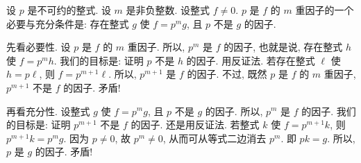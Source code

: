 \begin{proposition}
    设 $p$ 是不可约的整式. 设 $m$ 是非负整数. 设整式 $f \neq 0$. $p$ 是 $f$ 的 $m$ 重因子的一个必要与充分条件是: 存在整式 $g$ 使 $f = p^m g$, 且 $p$ 不是 $g$ 的因子.
\end{proposition}

\begin{pf}
    先看必要性. 设 $p$ 是 $f$ 的 $m$ 重因子. 所以, $p^m$ 是 $f$ 的因子, 也就是说, 存在整式 $h$ 使 $f = p^m h$. 我们的目标是: 证明 $p$ 不是 $h$ 的因子. 用反证法. 若存在整式 $\ell$ 使 $h = p\ell$, 则 $f = p^{m+1} \ell$. 所以, $p^{m+1}$ 是 $f$ 的因子. 不过, 既然 $p$ 是 $f$ 的 $m$ 重因子, $p^{m+1}$ 不是 $f$ 的因子. 矛盾!

    再看充分性. 设整式 $g$ 使 $f = p^m g$, 且 $p$ 不是 $g$ 的因子. 所以, $p^m$ 是 $f$ 的因子. 我们的目标是: 证明 $p^{m+1}$ 不是 $f$ 的因子. 还是用反证法. 若整式 $k$ 使 $f = p^{m+1} k$, 则 $p^{m+1} k = p^m g$. 因为 $p \neq 0$, 故 $p^m \neq 0$, 从而可从等式二边消去 $p^m$. 即 $pk = g$. 所以, $p$ 是 $g$ 的因子. 矛盾!
\end{pf}

